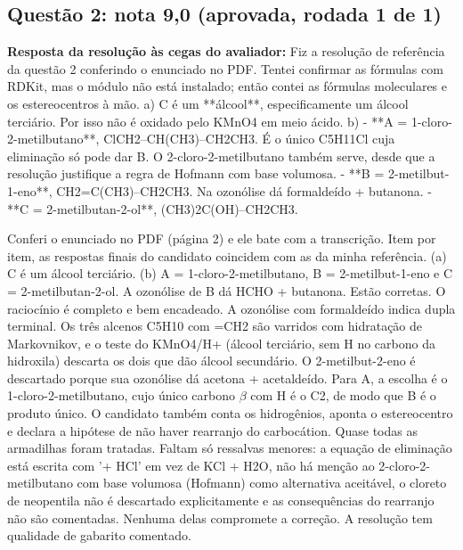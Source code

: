 \documentclass{article}%
\begin{document}
\subsection*{Questão 2: nota 9,0 (aprovada, rodada 1 de 1)}%
\textbf{Resposta da resolução às cegas do avaliador:} Fiz a resolução de referência da questão 2 conferindo o enunciado no PDF. Tentei confirmar as fórmulas com RDKit, mas o módulo não está instalado; então contei as fórmulas moleculares e os estereocentros à mão.\newline%
\newline%
a) C é um **álcool**, especificamente um álcool terciário. Por isso não é oxidado pelo KMnO4 em meio ácido.\newline%
\newline%
b)\newline%
{-} **A = 1{-}cloro{-}2{-}metilbutano**, ClCH2--CH(CH3)--CH2CH3. É o único C5H11Cl cuja eliminação só pode dar B. O 2{-}cloro{-}2{-}metilbutano também serve, desde que a resolução justifique a regra de Hofmann com base volumosa.\newline%
{-} **B = 2{-}metilbut{-}1{-}eno**, CH2=C(CH3)--CH2CH3. Na ozonólise dá formaldeído + butanona.\newline%
{-} **C = 2{-}metilbutan{-}2{-}ol**, (CH3)2C(OH)--CH2CH3.\par %
Conferi o enunciado no PDF (página 2) e ele bate com a transcrição. Item por item, as respostas finais do candidato coincidem com as da minha referência. (a) C é um álcool terciário. (b) A = 1{-}cloro{-}2{-}metilbutano, B = 2{-}metilbut{-}1{-}eno e C = 2{-}metilbutan{-}2{-}ol. A ozonólise de B dá HCHO + butanona. Estão corretas.\newline%
\newline%
O raciocínio é completo e bem encadeado. A ozonólise com formaldeído indica dupla terminal. Os três alcenos C5H10 com =CH2 são varridos com hidratação de Markovnikov, e o teste do KMnO4/H+ (álcool terciário, sem H no carbono da hidroxila) descarta os dois que dão álcool secundário. O 2{-}metilbut{-}2{-}eno é descartado porque sua ozonólise dá acetona + acetaldeído. Para A, a escolha é o 1{-}cloro{-}2{-}metilbutano, cujo único carbono $\beta$ com H é o C2, de modo que B é o produto único. O candidato também conta os hidrogênios, aponta o estereocentro e declara a hipótese de não haver rearranjo do carbocátion.\newline%
\newline%
Quase todas as armadilhas foram tratadas. Faltam só ressalvas menores: a equação de eliminação está escrita com '+ HCl' em vez de KCl + H2O, não há menção ao 2{-}cloro{-}2{-}metilbutano com base volumosa (Hofmann) como alternativa aceitável, o cloreto de neopentila não é descartado explicitamente e as consequências do rearranjo não são comentadas. Nenhuma delas compromete a correção. A resolução tem qualidade de gabarito comentado.%
\end{document}
